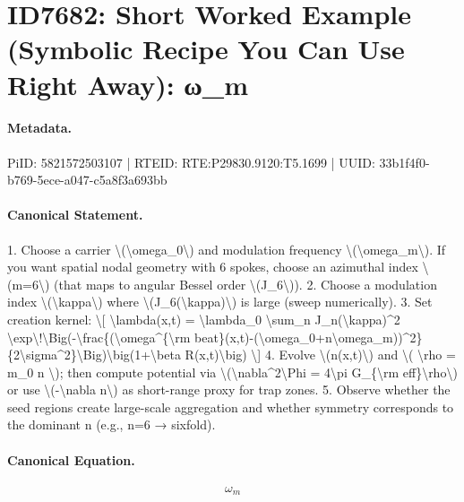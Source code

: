 \section*{ID7682: Short Worked Example (Symbolic Recipe You Can Use Right Away): ω\_m}
\paragraph{Metadata.}
PiID: 5821572503107 | RTEID: RTE:P29830.9120:T5.1699 | UUID: 33b1f4f0-b769-5ece-a047-c5a8f3a693bb

\paragraph{Canonical Statement.}
1. Choose a carrier \textbackslash{}(\textbackslash{}omega\_0\textbackslash{}) and modulation frequency \textbackslash{}(\textbackslash{}omega\_m\textbackslash{}). If you want spatial nodal geometry with 6 spokes, choose an azimuthal index \textbackslash{}(m=6\textbackslash{}) (that maps to angular Bessel order \textbackslash{}(J\_6\textbackslash{})). 2. Choose a modulation index \textbackslash{}(\textbackslash{}kappa\textbackslash{}) where \textbackslash{}(J\_6(\textbackslash{}kappa)\textbackslash{}) is large (sweep numerically). 3. Set creation kernel: \textbackslash{}[ \textbackslash{}lambda(x,t) = \textbackslash{}lambda\_0 \textbackslash{}sum\_n J\_n(\textbackslash{}kappa)\textasciicircum{}2 \textbackslash{}exp\textbackslash{}!\textbackslash{}Big(-\textbackslash{}frac\{(\textbackslash{}omega\textasciicircum{}\{\textbackslash{}rm beat\}(x,t)-(\textbackslash{}omega\_0+n\textbackslash{}omega\_m))\textasciicircum{}2\}\{2\textbackslash{}sigma\textasciicircum{}2\}\textbackslash{}Big)\textbackslash{}big(1+\textbackslash{}beta R(x,t)\textbackslash{}big) \textbackslash{}] 4. Evolve \textbackslash{}(n(x,t)\textbackslash{}) and \textbackslash{}( \textbackslash{}rho = m\_0 n \textbackslash{}); then compute potential via \textbackslash{}(\textbackslash{}nabla\textasciicircum{}2\textbackslash{}Phi = 4\textbackslash{}pi G\_\{\textbackslash{}rm eff\}\textbackslash{}rho\textbackslash{}) or use \textbackslash{}(-\textbackslash{}nabla n\textbackslash{}) as short-range proxy for trap zones. 5. Observe whether the seed regions create large-scale aggregation and whether symmetry corresponds to the dominant n (e.g., n=6 → sixfold).

\paragraph{Canonical Equation.}
\[
\omega_m
\]


